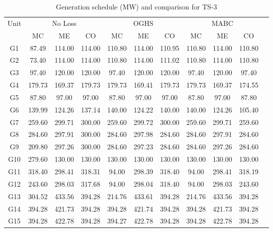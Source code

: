 \begin{table*}%
\centering
\renewcommand{\arraystretch}{1.3}
\caption{Generation schedule (MW) and comparison for TS-3}
\label{table_ts3}
\begin{threeparttable}[c]
\scalebox{0.7} {
\begin{tabular}{|c|c|c|c|c|c|c|c|c|c|c|}
\hline
\multirow{2}{*}{Unit} & \multicolumn{3}{c|}{No Loss} & \multicolumn{3}{c|}{OGHS} & \multicolumn{3}{c|}{MABC\tnote{\#} \cite{16EPESedGreedy}}  \\\cline{2-10}
 & MC & ME & CO & MC & ME & CO & MC & ME & CO\\
\hline
G1	&	87.49	&	114.00	&	114.00	&	110.80	&	114.00	&	110.95	&	110.80	&	114.00	&	110.80\\
\hline
G2	&	73.40	&	114.00	&	114.00	&	110.80	&	114.00	&	111.02	&	110.80	&	114.00	&	110.80\\
\hline
G3	&	97.40	&	120.00	&	120.00	&	97.40	&	120.00	&	120.00	&	97.40	&	120.00	&	97.40\\
\hline
G4	&	179.73	&	169.37	&	179.73	&	179.73	&	169.41	&	179.73	&	179.73	&	169.37	&	174.55\\
\hline
G5	&	87.80	&	97.00	&	97.00	&	87.80	&	97.00	&	97.00	&	87.80	&	97.00	&	87.80\\
\hline
G6	&	139.99	&	124.26	&	137.14	&	140.00	&	124.22	&	140.00	&	140.00	&	124.26	&	105.40\\
\hline
G7	&	259.60	&	299.71	&	300.00	&	259.60	&	299.72	&	300.00	&	259.60	&	299.71	&	259.60\\
\hline
G8	&	284.60	&	297.91	&	300.00	&	284.60	&	297.98	&	284.60	&	284.60	&	297.91	&	284.60\\
\hline
G9	&	209.80	&	297.26	&	300.00	&	284.60	&	297.23	&	284.60	&	284.60	&	297.26	&	284.60\\
\hline
G10	&	279.60	&	130.00	&	130.00	&	130.00	&	130.00	&	130.00	&	130.00	&	130.00	&	130.00\\
\hline
G11	&	318.40	&	298.41	&	318.31	&	94.00	&	298.39	&	318.40	&	94.00	&	298.41	&	318.19\\
\hline
G12	&	243.60	&	298.03	&	317.68	&	94.00	&	298.04	&	318.40	&	94.00	&	298.03	&	243.60\\
\hline
G13	&	304.52	&	433.56	&	394.28	&	214.76	&	433.61	&	394.28	&	214.76	&	433.56	&	394.28\\
\hline
G14	&	394.28	&	421.73	&	394.28	&	394.28	&	421.74	&	394.28	&	394.28	&	421.73	&	394.28\\
\hline
G15	&	394.28	&	422.78	&	394.28	&	394.27	&	422.78	&	394.28	&	394.28	&	422.78	&	394.28\\

\end{tabular}}
\end{threeparttable}
\end{table*}
